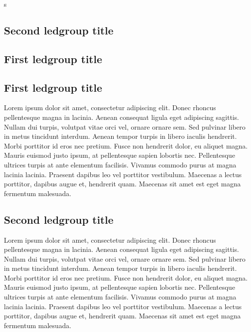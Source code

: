 \documentclass[12pt, a4paper]{book}
\begin{document}
s
\subsection{Second ledgroup title}
\begin{pages}
\begin{Leftside}
      \beginnumbering
     \pstart
       \section{First ledgroup title}
       \subsection{First ledgroup title}
     \pend
      \pstart
        \begin{ledgroup}\skipnumbering
           Lorem ipsum dolor sit amet, consectetur adipiscing elit. Donec rhoncus pellentesque magna in lacinia. Aenean consequat ligula eget adipiscing sagittis. Nullam dui turpis, volutpat vitae orci vel, ornare ornare sem. Sed pulvinar libero in metus tincidunt interdum. Aenean tempor turpis in libero iaculis hendrerit. Morbi porttitor id eros nec pretium. Fusce non hendrerit dolor, eu aliquet magna. Mauris euismod justo ipsum, at pellentesque sapien lobortis nec. Pellentesque ultrices turpis at ante elementum facilisis. Vivamus commodo purus at magna lacinia lacinia. Praesent dapibus leo vel porttitor vestibulum. Maecenas a lectus porttitor, dapibus augue et, hendrerit quam. Maecenas sit amet est eget magna fermentum malesuada.
        \end{ledgroup}
      \pend
     \pstart
    \vspace{1cm}
     \subsection{Second ledgroup title}
     \pend
      \pstart
        \begin{ledgroup}\skipnumbering
           Lorem ipsum dolor sit amet, consectetur adipiscing elit. Donec rhoncus pellentesque magna in lacinia. Aenean consequat ligula eget adipiscing sagittis. Nullam dui turpis, volutpat vitae orci vel, ornare ornare sem. Sed pulvinar libero in metus tincidunt interdum. Aenean tempor turpis in libero iaculis hendrerit. Morbi porttitor id eros nec pretium. Fusce non hendrerit dolor, eu aliquet magna. Mauris euismod justo ipsum, at pellentesque sapien lobortis nec. Pellentesque ultrices turpis at ante elementum facilisis. Vivamus commodo purus at magna lacinia lacinia. Praesent dapibus leo vel porttitor vestibulum. Maecenas a lectus porttitor, dapibus augue et, hendrerit quam. Maecenas sit amet est eget magna fermentum malesuada.
        \end{ledgroup}
      \pend
      \endnumbering
\end{Leftside}


\end{pages}
\end{document}

